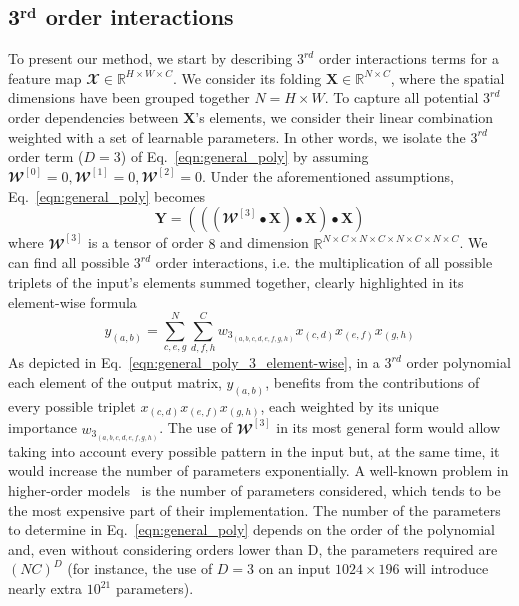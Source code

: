 \documentclass[10pt,twocolumn,letterpaper]{article}
\begin{document}
\subsection{ 3$\mathbf{^{rd}}$ order interactions}
To present our method, we start by describing $3^{rd}$ order interactions terms for a feature map $\mathbfcal{X}\in \mathbb{R}^{H \times W \times C}$. We consider its folding $\mathbf{X}\in \mathbb{R}^{N \times C}$, where the spatial dimensions have been grouped together $N=H\times W$. To capture all potential $3^{rd}$ order dependencies between $\mathbf{X}$'s elements, we consider their linear combination weighted with a set of learnable parameters. In other words, we isolate the $3^{rd}$ order term ($D=3$) of Eq.~\eqref{eqn:general_poly} by assuming $\mathbfcal{W}^{[0]}=0, \mathbfcal{W}^{[1]}=0, \mathbfcal{W}^{[2]}= 0$. Under the aforementioned assumptions, Eq.~\eqref{eqn:general_poly} becomes 
\begin{equation}
    \mathbf{Y}  = ( ( ( \mathbfcal{W}^{[3]}  \bullet \mathbf{X} ) \bullet  \mathbf{X}) \bullet  \mathbf{X} )
    \label{eqn:general_poly_3}
\end{equation}
where $\mathbfcal{W}^{[3]}$ is a tensor of order $8$ and dimension $\mathbb{R}^{N \times C \times N \times C \times N \times C \times N \times C}$. We can find all possible $3^{rd}$ order interactions, i.e. the multiplication of all possible triplets of the input's elements summed together, clearly highlighted in its element-wise formula 
\begin{equation}
        y_{(a,b)}=\sum_{c,e,g}^{N}\sum_{d,f,h}^{C} w_{3_{(a,b,c,d,e,f,g,h)}} x_{(c,d)} x_{(e,f)} x_{(g,h)}
      \label{eqn:general_poly_3_element-wise}
\end{equation}
As depicted in Eq.~\eqref{eqn:general_poly_3_element-wise}, in a $3^{rd}$ order polynomial each element of the output matrix, $y_{(a,b)}$, benefits from the contributions of every possible triplet $ x_{(c,d)} x_{(e,f)} x_{(g,h)}$, each weighted by its unique importance $w_{3_{(a,b,c,d,e,f,g,h)}}$. The use of $\mathbfcal{W}^{[3]}$ in its most general form would allow taking into account every possible pattern in the input but, at the same time, it would increase the number of parameters exponentially. A well-known problem in higher-order models~\cite{ sejnowski1986higher, chrysos2020p} is the number of parameters considered, which tends to be the most expensive part of their implementation. The number of the parameters to determine in Eq.~\eqref{eqn:general_poly} depends on the order of the polynomial and, even without considering orders lower than D, the parameters required are $(NC)^{D}$ (for instance, the use of $D=3$ on an input $1024 \times 196$ will introduce nearly extra $10^{21}$ parameters).
\end{document}
